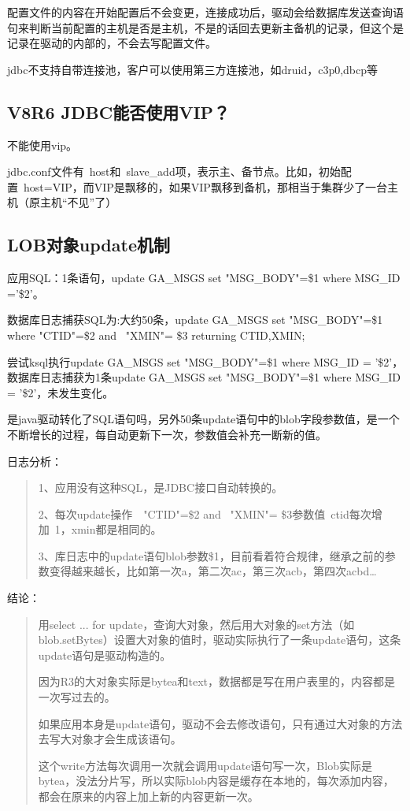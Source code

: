 \documentclass[a4,10pt,oneside,english]{sphinxmanual}
\let\sphinxpxdimen\pdfpxdimen\else\newdimen\sphinxpxdimen
\begin{document}
配置文件的内容在开始配置后不会变更，连接成功后，驱动会给数据库发送查询语句来判断当前配置的主机是否是主机，不是的话回去更新主备机的记录，但这个是记录在驱动的内部的，不会去写配置文件。

jdbc不支持自带连接池，客户可以使用第三方连接池，如druid，c3p0,dbcp等


\subsection{V8R6 JDBC能否使用VIP？}
\label{\detokenize{interface/jdbc:v8r6-jdbcvip}}
不能使用vip。

jdbc.conf文件有 host和 slave\_add项，表示主、备节点。比如，初始配置 host=VIP，而VIP是飘移的，如果VIP飘移到备机，那相当于集群少了一台主机（原主机“不见”了）


\subsection{LOB对象update机制}
\label{\detokenize{interface/jdbc:lobupdate}}
应用SQL：1条语句，update GA\_MSGS set "MSG\_BODY"=\$1 where MSG\_ID ='\$2'。

数据库日志捕获SQL为:大约50条，update GA\_MSGS set "MSG\_BODY"=\$1 where "CTID"=\$2 and  "XMIN"= \$3 returning CTID,XMIN;

尝试ksql执行update GA\_MSGS set "MSG\_BODY"=\$1 where MSG\_ID = '\$2'，数据库日志捕获为1条update GA\_MSGS set "MSG\_BODY"=\$1 where MSG\_ID = '\$2'，未发生变化。

是java驱动转化了SQL语句吗，另外50条update语句中的blob字段参数值，是一个不断增长的过程，每自动更新下一次，参数值会补充一断新的值。

日志分析：
\begin{quote}

1、应用没有这种SQL，是JDBC接口自动转换的。

2、每次update操作  "CTID"=\$2 and  "XMIN"= \$3参数值 ctid每次增加 1，xmin都是相同的。

3、库日志中的update语句blob参数\$1，目前看着符合规律，继承之前的参数变得越来越长，比如第一次a，第二次ac，第三次acb，第四次acbd…
\end{quote}

结论：
\begin{quote}

用select ... for update，查询大对象，然后用大对象的set方法（如blob.setBytes）设置大对象的值时，驱动实际执行了一条update语句，这条update语句是驱动构造的。

因为R3的大对象实际是bytea和text，数据都是写在用户表里的，内容都是一次写过去的。

如果应用本身是update语句，驱动不会去修改语句，只有通过大对象的方法去写大对象才会生成该语句。

这个write方法每次调用一次就会调用update语句写一次，Blob实际是bytea，没法分片写，所以实际blob内容是缓存在本地的，每次添加内容，都会在原来的内容上加上新的内容更新一次。

\begin{figure}[H]
\centering

\noindent\sphinxincludegraphics[width=554\sphinxpxdimen,height=416\sphinxpxdimen]{{jdbc-33958}.png}
\end{figure}
\end{quote}
\end{document}
